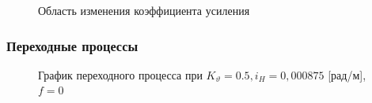 \begin{enumerate}
    \begin{figure}[H]
        \caption{Область изменения коэффициента усиления}
        \label{fig:Область изменения коэффициента усиления}
    \end{figure}

    \end{enumerate}
    
    \subsubsection{Переходные процессы}

    \begin{figure}[H]
        \caption{График переходного процесса при $K_{\vartheta}=0.5, i_H=0,000875$ [рад/м], $f=0$}
        \label{fig:Переходный процесс 1}
    \end{figure}

